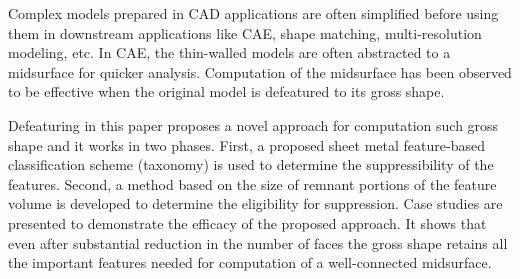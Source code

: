 Complex models prepared in CAD applications are often simplified before using them in downstream applications like CAE, shape matching, multi-resolution modeling, etc. In CAE, the thin-walled models are often abstracted to a midsurface for quicker analysis. Computation of the midsurface has been observed to be effective when the original model is defeatured to its gross shape. 

Defeaturing in this paper proposes a novel approach for computation such gross shape and it works in two phases. First, a proposed sheet metal feature-based classification scheme (taxonomy) is used to determine the suppressibility of the features. Second, a method based on the size of remnant portions of the feature volume is developed to determine the eligibility for suppression. Case studies are presented to demonstrate the efficacy of the proposed approach. It shows that even after substantial reduction in the number of faces the gross shape retains all the important features needed for computation of a well-connected midsurface.